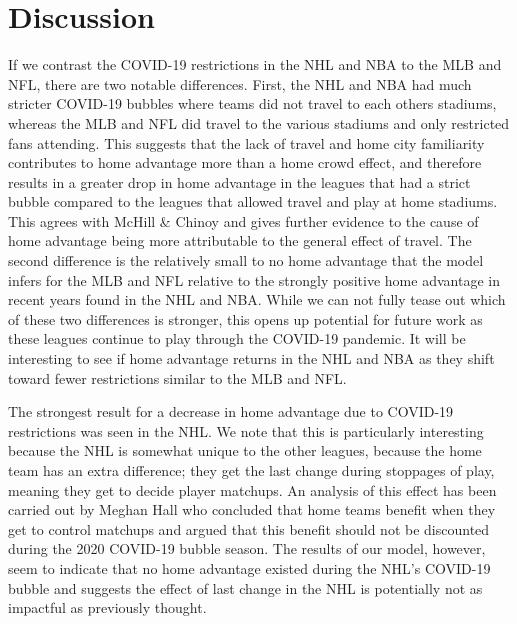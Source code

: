 \section*{Discussion}


If we contrast the COVID-19 restrictions in the NHL and NBA to the MLB and NFL, there are two notable differences. First, the NHL and NBA had much stricter COVID-19 bubbles where teams did not travel to each others stadiums, whereas the MLB and NFL did travel to the various stadiums and only restricted fans attending. This suggests that the lack of travel and home city familiarity contributes to home advantage more than a home crowd effect, and therefore results in a greater drop in home advantage in the leagues that had a strict bubble compared to the leagues that allowed travel and play at home stadiums. This agrees with McHill \& Chinoy \cite{McHill2020} and gives further evidence to the cause of home advantage being more attributable to the general effect of travel. The second difference is the relatively small to no home advantage that the model infers for the MLB and NFL relative to the strongly positive home advantage in recent years found in the NHL and NBA. While we can not fully tease out which of these two differences is stronger, this opens up potential for future work as these leagues continue to play through the COVID-19 pandemic. It will be interesting to see if home advantage returns in the NHL and NBA as they shift toward fewer restrictions similar to the MLB and NFL.

The strongest result for a decrease in home advantage due to COVID-19 restrictions was seen in the NHL. We note that this is particularly interesting because the NHL is somewhat unique to the other leagues, because the home team has an extra difference; they get the last change during stoppages of play, meaning they get to decide player matchups. An analysis of this effect has been carried out by Meghan Hall \cite{Hall2020} who concluded that home teams benefit when they get to control matchups and argued that this benefit should not be discounted during the 2020 COVID-19 bubble season. The results of our model, however, seem to indicate that no home advantage existed during the NHL's COVID-19 bubble and suggests the effect of last change in the NHL is potentially not as impactful as previously thought.

